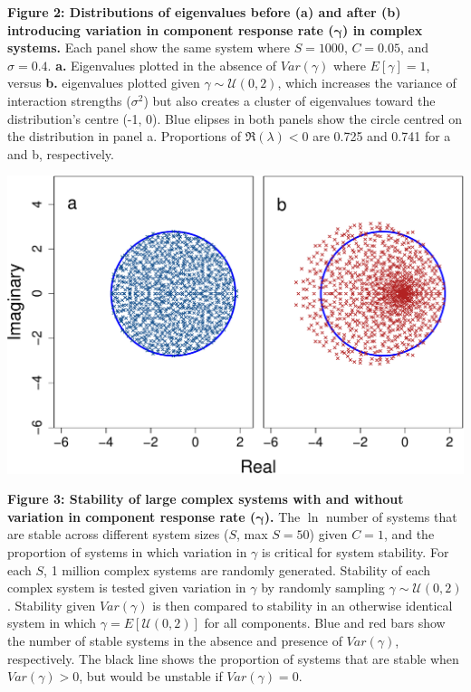 \documentclass[]{article}
\begin{document}
\clearpage

\textbf{Figure 2: Distributions of eigenvalues before (a) and after (b)
introducing variation in component response rate
(\(\boldsymbol{\gamma}\)) in complex systems.} Each panel show the same
system where \(S = 1000\), \(C = 0.05\), and \(\sigma = 0.4\).
\textbf{a.} Eigenvalues plotted in the absence of \(Var(\gamma)\) where
\(E[\gamma] = 1\), versus \textbf{b.} eigenvalues plotted given
\(\gamma \sim \mathcal{U}(0, 2)\), which increases the variance of
interaction strengths (\(\sigma^{2}\)) but also creates a cluster of
eigenvalues toward the distribution's centre (-1, 0). Blue elipses in
both panels show the circle centred on the distribution in panel a.
Proportions of \(\Re(\lambda) < 0\) are 0.725 and 0.741 for a and b,
respectively.

\includegraphics{ms_files/figure-latex/unnamed-chunk-13-1.pdf}

\clearpage

\textbf{Figure 3: Stability of large complex systems with and without
variation in component response rate (\(\boldsymbol{\gamma}\)).} The
\(\ln\) number of systems that are stable across different system sizes
(\(S\), max \(S=50\)) given \(C = 1\), and the proportion of systems in
which variation in \(\gamma\) is critical for system stability. For each
\(S\), 1 million complex systems are randomly generated. Stability of
each complex system is tested given variation in \(\gamma\) by randomly
sampling \(\gamma \sim \mathcal{U}(0, 2)\). Stability given
\(Var(\gamma)\) is then compared to stability in an otherwise identical
system in which \(\gamma = E[\mathcal{U}(0, 2)]\) for all components.
Blue and red bars show the number of stable systems in the absence and
presence of \(Var(\gamma)\), respectively. The black line shows the
proportion of systems that are stable when \(Var(\gamma) > 0\), but
would be unstable if \(Var(\gamma) = 0\).
\end{document}
